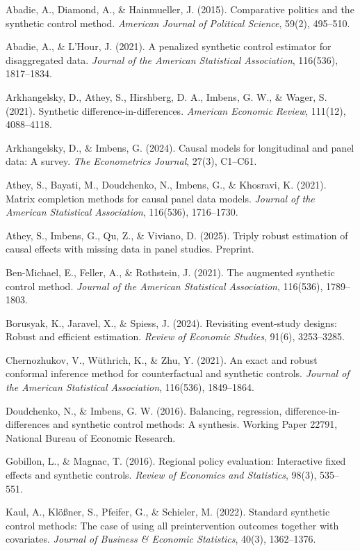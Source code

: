\documentclass[
]{article}
\begin{document}
Abadie, A., Diamond, A., \& Hainmueller, J. (2015). Comparative politics and the synthetic control method. \emph{American Journal of Political Science}, 59(2), 495--510.

Abadie, A., \& L'Hour, J. (2021). A penalized synthetic control estimator for disaggregated data. \emph{Journal of the American Statistical Association}, 116(536), 1817--1834.

Arkhangelsky, D., Athey, S., Hirshberg, D. A., Imbens, G. W., \& Wager, S. (2021). Synthetic difference-in-differences. \emph{American Economic Review}, 111(12), 4088--4118.

Arkhangelsky, D., \& Imbens, G. (2024). Causal models for longitudinal and panel data: A survey. \emph{The Econometrics Journal}, 27(3), C1--C61.

Athey, S., Bayati, M., Doudchenko, N., Imbens, G., \& Khosravi, K. (2021). Matrix completion methods for causal panel data models. \emph{Journal of the American Statistical Association}, 116(536), 1716--1730.

Athey, S., Imbens, G., Qu, Z., \& Viviano, D. (2025). Triply robust estimation of causal effects with missing data in panel studies. Preprint.

Ben-Michael, E., Feller, A., \& Rothstein, J. (2021). The augmented synthetic control method. \emph{Journal of the American Statistical Association}, 116(536), 1789--1803.

Borusyak, K., Jaravel, X., \& Spiess, J. (2024). Revisiting event-study designs: Robust and efficient estimation. \emph{Review of Economic Studies}, 91(6), 3253--3285.

Chernozhukov, V., Wüthrich, K., \& Zhu, Y. (2021). An exact and robust conformal inference method for counterfactual and synthetic controls. \emph{Journal of the American Statistical Association}, 116(536), 1849--1864.

Doudchenko, N., \& Imbens, G. W. (2016). Balancing, regression, difference-in-differences and synthetic control methods: A synthesis. Working Paper 22791, National Bureau of Economic Research.

Gobillon, L., \& Magnac, T. (2016). Regional policy evaluation: Interactive fixed effects and synthetic controls. \emph{Review of Economics and Statistics}, 98(3), 535--551.

Kaul, A., Klößner, S., Pfeifer, G., \& Schieler, M. (2022). Standard synthetic control methods: The case of using all preintervention outcomes together with covariates. \emph{Journal of Business \& Economic Statistics}, 40(3), 1362--1376.
\end{document}
